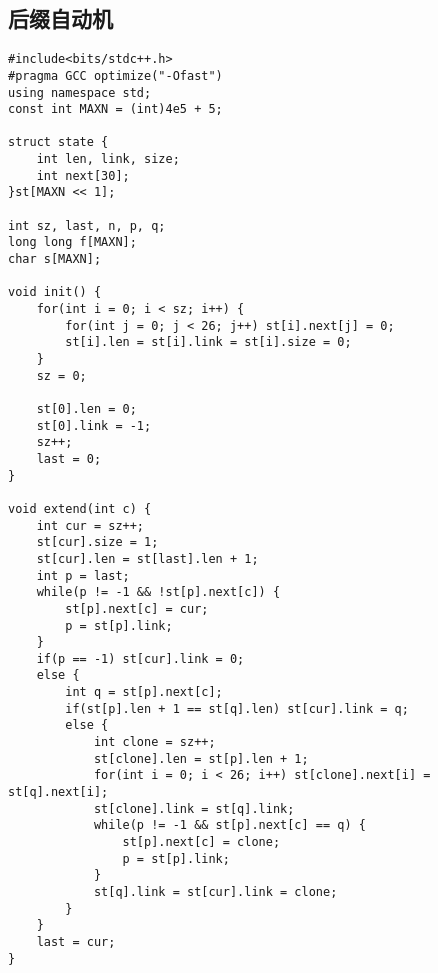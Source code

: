\subsection{后缀自动机}
\begin{lstlisting}
#include<bits/stdc++.h>
#pragma GCC optimize("-Ofast")
using namespace std;
const int MAXN = (int)4e5 + 5;

struct state {
	int len, link, size;
	int next[30];
}st[MAXN << 1];

int sz, last, n, p, q;
long long f[MAXN];
char s[MAXN];

void init() {
	for(int i = 0; i < sz; i++) {
		for(int j = 0; j < 26; j++) st[i].next[j] = 0;
		st[i].len = st[i].link = st[i].size = 0;
	}
	sz = 0;
	
	st[0].len = 0;
	st[0].link = -1;
	sz++;
	last = 0; 
}

void extend(int c) {
	int cur = sz++;
	st[cur].size = 1;
	st[cur].len = st[last].len + 1;
	int p = last;
	while(p != -1 && !st[p].next[c]) {
		st[p].next[c] = cur;
		p = st[p].link;
	} 
	if(p == -1) st[cur].link = 0;
	else {
		int q = st[p].next[c];
		if(st[p].len + 1 == st[q].len) st[cur].link = q;
		else {
			int clone = sz++;
			st[clone].len = st[p].len + 1;
			for(int i = 0; i < 26; i++) st[clone].next[i] = st[q].next[i];
			st[clone].link = st[q].link;
			while(p != -1 && st[p].next[c] == q) {
				st[p].next[c] = clone;
				p = st[p].link;
			}
			st[q].link = st[cur].link = clone;
		}
	}
	last = cur;
}

\end{lstlisting}
